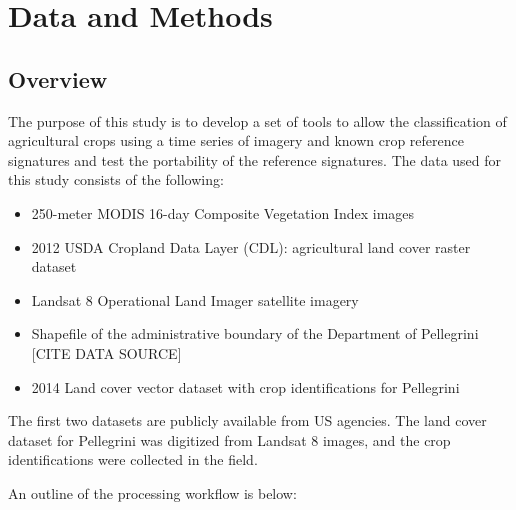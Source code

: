 \chapter{Data and Methods}

\section{Overview}

The purpose of this study is to develop a set of tools to allow the classification of agricultural crops using a time series of imagery and known crop reference signatures and test the portability of the reference signatures. The data used for this study consists of the following:

\begin{Spacing}{1.5}
\begin{itemize}
  \item 250-meter MODIS 16-day Composite Vegetation Index images
  \item 2012 USDA Cropland Data Layer (CDL): agricultural land cover raster dataset
  \item Landsat 8 Operational Land Imager satellite imagery
  \item Shapefile of the administrative boundary of the Department of Pellegrini [CITE DATA SOURCE]
  \item 2014 Land cover vector dataset with crop identifications for Pellegrini
\end{itemize}
\end{Spacing}

The first two datasets are publicly available from US agencies. The land cover dataset for Pellegrini was digitized from Landsat 8 images, and the crop identifications were collected in the field.

An outline of the processing workflow is below:

